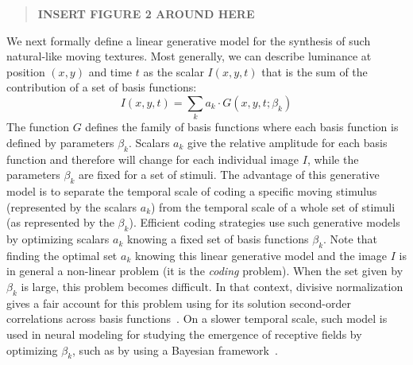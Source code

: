 \documentclass[a4paper,11pt]{article}%
\begin{document}
\begin{quote}
	\begin{center}
		\textbf{INSERT FIGURE 2 AROUND HERE}
	\end{center}
\end{quote}

We next formally define a linear generative model for the synthesis of such natural-like moving textures. Most generally, we can describe luminance at position $(x,y)$ and time $t$ as the scalar $I(x, y, t)$ that is the sum of the contribution of a set of basis functions:
\begin{equation}%
I(x, y, t) = \sum_k a_k \cdot G(x, y, t; \beta_k) \label{eq:gen1}%
\end{equation}%
The function $G$ defines the family of basis functions where each basis function is defined by parameters $\beta_k$. Scalars $a_k$ give the relative amplitude for each basis function and therefore will change for each individual image $I$, while the parameters $\beta_k$ are fixed for a set of stimuli. The advantage of this generative model is to separate the temporal scale of coding a specific moving stimulus (represented by the scalars $a_k$) from the temporal scale of a whole set of stimuli (as represented by the $\beta_k$). Efficient coding strategies use such generative models by optimizing scalars $a_k$ knowing a fixed set of basis functions $\beta_k$. %
Note that finding the optimal set $a_k$ knowing this linear generative model and the image $I$ is in general a non-linear problem (it is the \emph{coding} problem). When the set given by $\beta_k$ is large, this problem becomes difficult. %
In that context, divisive normalization gives a fair account for this problem using for its solution second-order correlations across basis functions~\citep{Schwartz01}. On a slower temporal scale, such model is used in neural modeling for studying the emergence of receptive fields by optimizing $\beta_k$, such as by using a Bayesian framework~\citep{Perrinet10shl}. %
\end{document}
